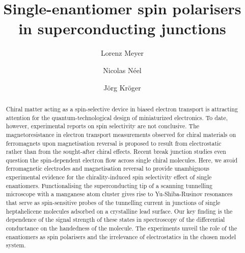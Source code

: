 \documentclass[aps,floatfix,12pt]{revtex4-2}
\begin{document}
\author{Lorenz Meyer}
\author{Nicolas Néel}
\author{Jörg Kröger}

\title{Single-enantiomer spin polarisers in superconducting junctions}

\begin{abstract}
Chiral matter acting as a spin-selective device in biased electron transport is attracting attention for the quantum-technological design of miniaturized electronics.
To date, however, experimental reports on spin selectivity are not conclusive.
The magnetoresistance in electron transport measurements observed for chiral materials on ferromagnets upon magnetisation reversal is proposed to result from electrostatic rather than from the sought-after chiral effects.
Recent break junction studies even question the spin-dependent electron flow across single chiral molecules.
Here, we avoid ferromagnetic electrodes and magnetisation reversal to provide unambiguous experimental evidence for the chirality-induced spin selectivity effect of single enantiomers.
Functionalising the superconducting tip of a scanning tunnelling microscope with a manganese atom cluster gives rise to Yu-Shiba-Rusinov resonances that serve as spin-sensitive probes of the tunnelling current in junctions of single heptahelicene molecules adsorbed on a crystalline lead surface.
Our key finding is the dependence of the signal strength of these states in spectroscopy of the differential conductance on the handedness of the molecule.
The experiments unveil the role of the enantiomers as spin polarisers and the irrelevance of electrostatics in the chosen model system.
\end{abstract}

\maketitle
\end{document}
